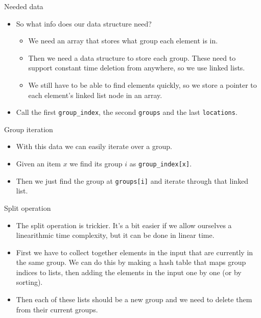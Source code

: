 \documentclass{beamer}
\begin{document}
	\begin{frame}[plain]{Needed data}
		\begin{itemize}
			\item So what info does our data structure need? 
			\begin{itemize}
				\item<2-> We need an array that stores what group each element is in.
				\item<3-> Then we need a data structure to store each group. These need to support constant time deletion from anywhere, so we use linked lists.
				\item<4-> We still have to be able to find elements quickly, so we store a pointer to each element's linked list node in an array.
			\end{itemize}
			\item<5-> Call the first \texttt{group\_index}, the second \texttt{groups} and the last \texttt{locations}.
		\end{itemize}
	\end{frame}
	
	\begin{frame}[plain]{Group iteration}
		\begin{itemize}
			\item With this data we can easily iterate over a group.
			\item Given an item $x$ we find its group $i$ as \texttt{group\_index[x]}.
			\item Then we just find the group at \texttt{groups[i]} and iterate through that linked list.
		\end{itemize}
	\end{frame}
	
	\begin{frame}[plain]{Split operation}
		\begin{itemize}
			\item The split operation is trickier. It's a bit easier if we allow ourselves a linearithmic time complexity, but it can be done in linear time.
			\item First we have to collect together elements in the input that are currently in the same group. We can do this by making a hash table that maps group indices to lists, then adding the elements in the input one by one (or by sorting).
			\item Then each of these lists should be a new group and we need to delete them from their current groups.
		\end{itemize}
	\end{frame}
	
\end{document}
